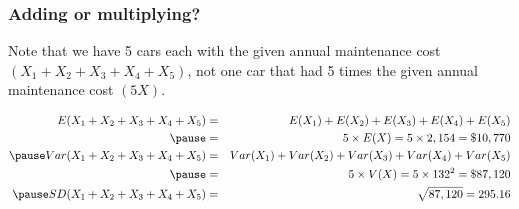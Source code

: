 \documentclass[slidestop,compress,mathserif]{beamer}
\begin{document}

\begin{frame}
\frametitle{Adding or multiplying?}


\pause

Note that we have 5 cars each with the given annual maintenance cost $(X_1 + X_2 + X_3 + X_4 + X_5)$, not one car that had 5 times the given annual maintenance cost $(5X)$.

\pause

{\small
\begin{eqnarray*} 
E(X_1 + X_2 + X_3 + X_4 + X_5) &=& E(X_1) + E(X_2) + E(X_3) + E(X_4) + E(X_5) \\
\pause
&=& 5 \times E(X) = 5 \times 2,154 = \$ 10,770 \\
\pause
Var(X_1 + X_2 + X_3 + X_4 + X_5) &=& Var(X_1) + Var(X_2) + Var(X_3) + Var(X_4) + Var(X_5) \\
\pause
&=& 5 \times V(X) = 5 \times 132^2 = \$ 87,120 \\
\pause
SD(X_1 + X_2 + X_3 + X_4 + X_5) &=& \sqrt{87,120} =  295.16
\end{eqnarray*}
}

\end{frame}

%

\end{document}
